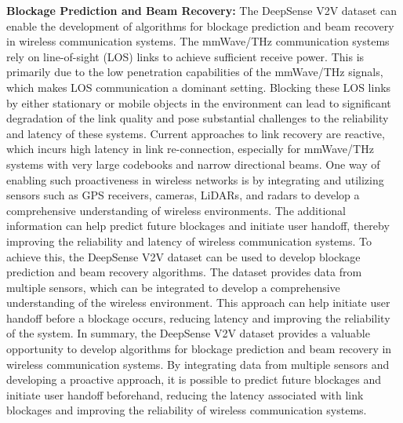 \documentclass[10pt,comsoc]{IEEEtran}
\begin{document}
\textbf{Blockage Prediction and Beam Recovery:} The DeepSense V2V dataset can enable the development of algorithms for blockage prediction and beam recovery in wireless communication systems. The mmWave/THz communication systems rely on line-of-sight (LOS) links to achieve sufficient receive power. This is primarily due to the low penetration capabilities of the mmWave/THz signals, which makes LOS communication a dominant setting. Blocking these LOS links by either stationary or mobile objects in the environment can lead to significant degradation of the link quality and pose substantial challenges to the reliability and latency of these systems. Current approaches to link recovery are reactive, which incurs high latency in link re-connection, especially for mmWave/THz systems with very large codebooks and narrow directional beams. One way of enabling such proactiveness in wireless networks is by integrating and utilizing sensors such as GPS receivers, cameras, LiDARs, and radars to develop a comprehensive understanding of wireless environments. The additional information can help predict future blockages and initiate user handoff, thereby improving the reliability and latency of wireless communication systems. To achieve this, the DeepSense V2V dataset can be used to develop blockage prediction and beam recovery algorithms. The dataset provides data from multiple sensors, which can be integrated to develop a comprehensive understanding of the wireless environment. This approach can help initiate user handoff before a blockage occurs, reducing latency and improving the reliability of the system. In summary, the DeepSense V2V dataset provides a valuable opportunity to develop algorithms for blockage prediction and beam recovery in wireless communication systems. By integrating data from multiple sensors and developing a proactive approach, it is possible to predict future blockages and initiate user handoff beforehand, reducing the latency associated with link blockages and improving the reliability of wireless communication systems.
\end{document}
